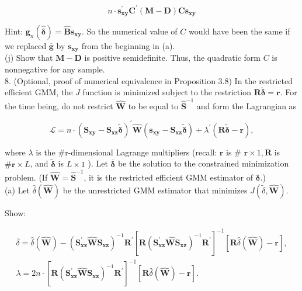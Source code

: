 \documentclass[10pt]{article}
\begin{document}
$$
n \cdot \mathbf{s}_{\mathbf{x y}}^{\prime} \mathbf{C}^{\prime}(\mathbf{M}-\mathbf{D}) \mathbf{C s}_{\mathbf{x y}}
$$

Hint: $\mathbf{g}_{n}(\hat{\boldsymbol{\delta}})=\widehat{\mathbf{B}} \mathbf{s}_{\mathbf{x y}}$. So the numerical value of $C$ would have been the same if we replaced $\overline{\mathbf{g}}$ by $\mathbf{s}_{\mathbf{x y}}$ from the beginning in (a).\\
(j) Show that $\mathbf{M}-\mathbf{D}$ is positive semidefinite. Thus, the quadratic form $C$ is nonnegative for any sample.\\
8. (Optional, proof of numerical equivalence in Proposition 3.8) In the restricted efficient GMM, the $J$ function is minimized subject to the restriction $\mathbf{R} \tilde{\boldsymbol{\delta}}=\mathbf{r}$. For the time being, do not restrict $\widehat{\mathbf{W}}$ to be equal to $\widehat{\mathbf{S}}^{-1}$ and form the Lagrangian as

$$
\mathcal{L}=n \cdot\left(\mathbf{S}_{\mathbf{x y}}-\mathbf{S}_{\mathbf{x z}} \tilde{\boldsymbol{\delta}}\right)^{\prime} \widehat{\mathbf{W}}\left(\mathbf{s}_{\mathbf{x y}}-\mathbf{S}_{\mathbf{x z}} \tilde{\boldsymbol{\delta}}\right)+\lambda^{\prime}(\mathbf{R} \tilde{\boldsymbol{\delta}}-\mathbf{r}),
$$

where $\lambda$ is the \#r-dimensional Lagrange multipliers (recall: $\mathbf{r}$ is \# $\mathbf{r} \times 1, \mathbf{R}$ is $\# \mathbf{r} \times L$, and $\tilde{\boldsymbol{\delta}}$ is $L \times 1$ ). Let $\overline{\boldsymbol{\delta}}$ be the solution to the constrained minimization problem. (If $\widehat{\mathbf{W}}=\widehat{\mathbf{S}}^{-1}$, it is the restricted efficient GMM estimator of $\boldsymbol{\delta}$.)\\
(a) Let $\hat{\delta}(\widehat{\mathbf{W}})$ be the unrestricted GMM estimator that minimizes $J(\tilde{\delta}, \widehat{\mathbf{W}})$.

Show:

$$
\begin{gathered}
\bar{\delta}=\hat{\delta}(\widehat{\mathbf{W}})-\left(\mathbf{S}_{\mathbf{x z}}^{\prime} \widehat{\mathbf{W}} \mathbf{S}_{\mathbf{x z}}\right)^{-1} \mathbf{R}^{\prime}\left[\mathbf{R}\left(\mathbf{S}_{\mathbf{x z}}^{\prime} \widehat{\mathbf{W}} \mathbf{S}_{\mathbf{x z}}\right)^{-1} \mathbf{R}^{\prime}\right]^{-1}[\mathbf{R} \hat{\delta}(\widehat{\mathbf{W}})-\mathbf{r}], \\
\lambda=2 n \cdot\left[\mathbf{R}\left(\mathbf{S}_{\mathbf{x z}}^{\prime} \widehat{\mathbf{W}} \mathbf{S}_{\mathbf{x z}}\right)^{-1} \mathbf{R}^{\prime}\right]^{-1}[\mathbf{R} \hat{\delta}(\widehat{\mathbf{W}})-\mathbf{r}] .
\end{gathered}
$$
\end{document}
